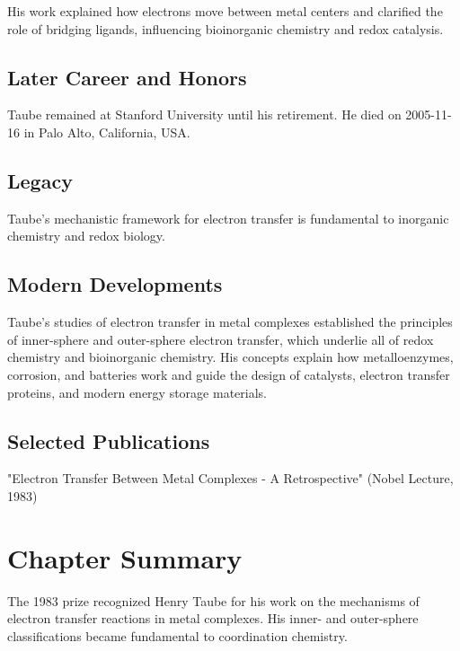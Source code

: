 His work explained how electrons move between metal centers and clarified the role of bridging ligands, influencing bioinorganic chemistry and redox catalysis.

\subsection*{Later Career and Honors}

Taube remained at Stanford University until his retirement. He died on 2005-11-16 in Palo Alto, California, USA.

\subsection*{Legacy}

Taube's mechanistic framework for electron transfer is fundamental to inorganic chemistry and redox biology.

\subsection*{Modern Developments}

Taube's studies of electron transfer in metal complexes established the principles of inner-sphere and outer-sphere electron transfer, which underlie all of redox chemistry and bioinorganic chemistry. His concepts explain how metalloenzymes, corrosion, and batteries work and guide the design of catalysts, electron transfer proteins, and modern energy storage materials.

\subsection*{Selected Publications}

"Electron Transfer Between Metal Complexes - A Retrospective" (Nobel Lecture, 1983)

\clearpage

\section*{Chapter Summary}

The 1983 prize recognized Henry Taube for his work on the mechanisms of electron transfer reactions in metal complexes. His inner- and outer-sphere classifications became fundamental to coordination chemistry.

